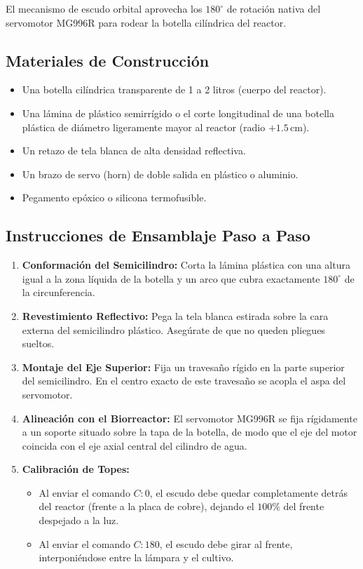 \documentclass[11pt,letterpaper]{article}
\begin{document}
El mecanismo de escudo orbital aprovecha los $180^\circ$ de rotación nativa del servomotor MG996R para rodear la botella cilíndrica del reactor.

\subsection{Materiales de Construcción}
\begin{itemize}
    \item Una botella cilíndrica transparente de 1 a 2 litros (cuerpo del reactor).
    \item Una lámina de plástico semirrígido o el corte longitudinal de una botella plástica de diámetro ligeramente mayor al reactor (radio $+1.5\,\text{cm}$).
    \item Un retazo de tela blanca de alta densidad reflectiva.
    \item Un brazo de servo (horn) de doble salida en plástico o aluminio.
    \item Pegamento epóxico o silicona termofusible.
\end{itemize}

\subsection{Instrucciones de Ensamblaje Paso a Paso}
\begin{enumerate}
    \item \textbf{Conformación del Semicilindro:} Corta la lámina plástica con una altura igual a la zona líquida de la botella y un arco que cubra exactamente $180^\circ$ de la circunferencia.
    \item \textbf{Revestimiento Reflectivo:} Pega la tela blanca estirada sobre la cara externa del semicilindro plástico. Asegúrate de que no queden pliegues sueltos.
    \item \textbf{Montaje del Eje Superior:} Fija un travesaño rígido en la parte superior del semicilindro. En el centro exacto de este travesaño se acopla el aspa del servomotor.
    \item \textbf{Alineación con el Biorreactor:} El servomotor MG996R se fija rígidamente a un soporte situado sobre la tapa de la botella, de modo que el eje del motor coincida con el eje axial central del cilindro de agua.
    \item \textbf{Calibración de Topes:} 
    \begin{itemize}
        \item Al enviar el comando $C:0$, el escudo debe quedar completamente detrás del reactor (frente a la placa de cobre), dejando el $100\%$ del frente despejado a la luz.
        \item Al enviar el comando $C:180$, el escudo debe girar al frente, interponiéndose entre la lámpara y el cultivo.
    \end{itemize}
\end{enumerate}
\end{document}
